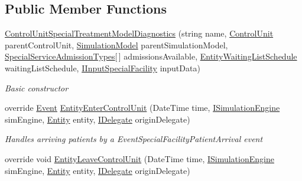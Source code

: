 \subsection*{Public Member Functions}
\begin{DoxyCompactItemize}
\item 
\hyperlink{class_sample_hospital_model_1_1_diagnostics_1_1_control_unit_special_treatment_model_diagnostics_aface32b2b8cff6b477c5cb63a7ce00b1}{Control\+Unit\+Special\+Treatment\+Model\+Diagnostics} (string name, \hyperlink{class_simulation_core_1_1_h_c_c_m_elements_1_1_control_unit}{Control\+Unit} parent\+Control\+Unit, \hyperlink{class_simulation_core_1_1_simulation_classes_1_1_simulation_model}{Simulation\+Model} parent\+Simulation\+Model, \hyperlink{class_general_health_care_elements_1_1_treatment_admission_types_1_1_special_service_admission_types}{Special\+Service\+Admission\+Types}\mbox{[}$\,$\mbox{]} admissions\+Available, \hyperlink{class_general_health_care_elements_1_1_booking_models_1_1_entity_waiting_list_schedule}{Entity\+Waiting\+List\+Schedule} waiting\+List\+Schedule, \hyperlink{interface_general_health_care_elements_1_1_special_facility_1_1_i_input_special_facility}{I\+Input\+Special\+Facility} input\+Data)
\begin{DoxyCompactList}\small\item\em Basic constructor \end{DoxyCompactList}\item 
override \hyperlink{class_simulation_core_1_1_h_c_c_m_elements_1_1_event}{Event} \hyperlink{class_sample_hospital_model_1_1_diagnostics_1_1_control_unit_special_treatment_model_diagnostics_a666d864d36879820aeecc7c34d125ff0}{Entity\+Enter\+Control\+Unit} (Date\+Time time, \hyperlink{interface_simulation_core_1_1_simulation_classes_1_1_i_simulation_engine}{I\+Simulation\+Engine} sim\+Engine, \hyperlink{class_simulation_core_1_1_h_c_c_m_elements_1_1_entity}{Entity} entity, \hyperlink{interface_simulation_core_1_1_h_c_c_m_elements_1_1_i_delegate}{I\+Delegate} origin\+Delegate)
\begin{DoxyCompactList}\small\item\em Handles arriving patients by a Event\+Special\+Facility\+Patient\+Arrival event \end{DoxyCompactList}\item 
override void \hyperlink{class_sample_hospital_model_1_1_diagnostics_1_1_control_unit_special_treatment_model_diagnostics_a3baab04bf71ddc65fa19bea042be4eb3}{Entity\+Leave\+Control\+Unit} (Date\+Time time, \hyperlink{interface_simulation_core_1_1_simulation_classes_1_1_i_simulation_engine}{I\+Simulation\+Engine} sim\+Engine, \hyperlink{class_simulation_core_1_1_h_c_c_m_elements_1_1_entity}{Entity} entity, \hyperlink{interface_simulation_core_1_1_h_c_c_m_elements_1_1_i_delegate}{I\+Delegate} origin\+Delegate)

\end{DoxyCompactItemize}
